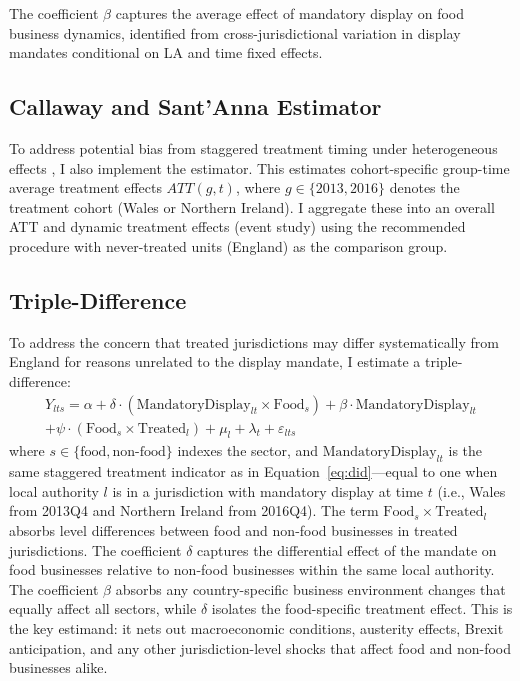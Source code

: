 \documentclass[12pt]{article}
\begin{document}
The coefficient $\beta$ captures the average effect of mandatory display on food business dynamics, identified from cross-jurisdictional variation in display mandates conditional on LA and time fixed effects.

\subsection{Callaway and Sant'Anna Estimator}

To address potential bias from staggered treatment timing under heterogeneous effects \citep{goodman2021difference, sun2021estimating}, I also implement the \citet{callaway2021difference} estimator. This estimates cohort-specific group-time average treatment effects $ATT(g,t)$, where $g \in \{2013, 2016\}$ denotes the treatment cohort (Wales or Northern Ireland). I aggregate these into an overall ATT and dynamic treatment effects (event study) using the recommended procedure with never-treated units (England) as the comparison group.

\subsection{Triple-Difference}

To address the concern that treated jurisdictions may differ systematically from England for reasons unrelated to the display mandate, I estimate a triple-difference:
\begin{multline}
Y_{lts} = \alpha + \delta \cdot (\text{MandatoryDisplay}_{lt} \times \text{Food}_s) + \beta \cdot \text{MandatoryDisplay}_{lt} \\
 + \psi \cdot (\text{Food}_s \times \text{Treated}_l) + \mu_l + \lambda_t + \varepsilon_{lts}
\label{eq:ddd}
\end{multline}
where $s \in \{\text{food}, \text{non-food}\}$ indexes the sector, and $\text{MandatoryDisplay}_{lt}$ is the same staggered treatment indicator as in Equation~\eqref{eq:did}---equal to one when local authority $l$ is in a jurisdiction with mandatory display at time $t$ (i.e., Wales from 2013Q4 and Northern Ireland from 2016Q4). The term $\text{Food}_s \times \text{Treated}_l$ absorbs level differences between food and non-food businesses in treated jurisdictions. The coefficient $\delta$ captures the differential effect of the mandate on food businesses relative to non-food businesses within the same local authority. The coefficient $\beta$ absorbs any country-specific business environment changes that equally affect all sectors, while $\delta$ isolates the food-specific treatment effect. This is the key estimand: it nets out macroeconomic conditions, austerity effects, Brexit anticipation, and any other jurisdiction-level shocks that affect food and non-food businesses alike.
\end{document}

